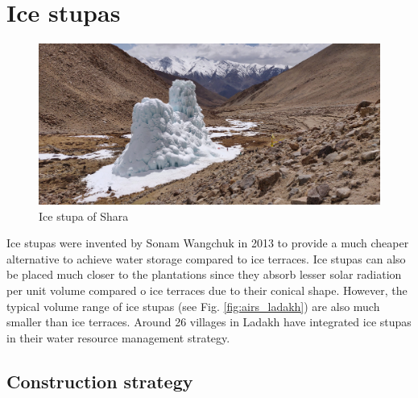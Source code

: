 

\section{Ice stupas}

\begin{figure}[htb]
\centering
\includegraphics[width=12cm]{figs/IS_example.jpg}

\caption{Ice stupa of Shara}

\label{fig:ISexample}
\end{figure}

Ice stupas were invented by Sonam Wangchuk in 2013 \cite{wangchukIceStupaArtificial2014} to provide a much
cheaper alternative to achieve water storage compared to ice terraces. Ice stupas can also be placed much closer
to the plantations since they absorb lesser solar radiation per unit volume compared o ice terraces due to their
conical shape. However, the typical volume range of ice stupas (see Fig. \ref{fig:airs_ladakh}) are also much
smaller than ice terraces. Around 26 villages in Ladakh \cite{wangchukIceStupaCompetition2020} have integrated
ice stupas in their water resource management strategy.

\subsection{Construction strategy}

